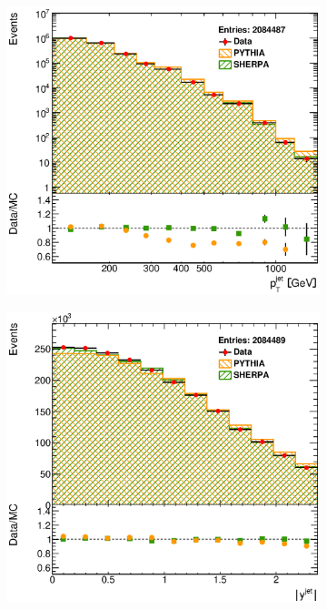 \documentclass[12pt, twoside]{article}
\numberwithin{equation}{section}
\numberwithin{figure}{section}
\newenvironment{changemargin}[2]{%
\begin{list}{}{%
\setlength{\topsep}{0pt}%
\setlength{\leftmargin}{#1}%
\setlength{\rightmargin}{#2}%
\setlength{\listparindent}{\parindent}%
\setlength{\itemindent}{\parindent}%
\setlength{\parsep}{\parskip}%
}%
\item[]}{\end{list}}
\begin{document}
\begin{figure}
\begin{changemargin}{-1.0cm}{-0.75cm}
\begin{changemargin}{-0.75cm}{-1.0cm}
        \vspace{0.2cm}
        \begin{subfigure}[b]{0.37\textwidth}
            \includegraphics[width=\textwidth]{./images/Results(Default)/DEF-104.eps}
            \subcaption{}
            \label{fig:DefaultPtJet}
        \end{subfigure}
        \begin{subfigure}[b]{0.37\textwidth}
            \includegraphics[width=\textwidth]{./images/Results(Default)/DEF-105.eps}

\end{subfigure}
\end{changemargin}
\end{changemargin}
\end{figure}
\end{document}
